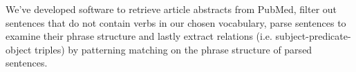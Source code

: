 We've developed software to retrieve article abstracts from PubMed, filter out sentences
that do not contain verbs in our chosen vocabulary, parse sentences to examine their phrase
structure and lastly extract relations (i.e. subject-predicate-object triples) by patterning
matching on the phrase structure of parsed sentences.
